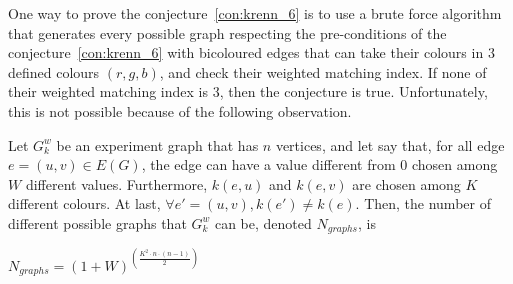 One way to prove the conjecture~\ref{con:krenn_6} is to use a brute force algorithm that generates every possible graph respecting the pre-conditions of the conjecture~\ref{con:krenn_6} with bicoloured edges that can take their colours in $3$ defined colours $(r, g, b)$, and check their weighted matching index.
If none of their weighted matching index is $3$, then the conjecture is true.
Unfortunately, this is not possible because of the following observation.\\

\begin{observation}
    Let $G_k^w$ be an experiment graph that has $n$ vertices, and let say that, for all edge $e = (u, v) \in E(G)$, the edge can have a value different from $0$ chosen among $W$ different values.
    Furthermore, $k(e, u)$ and $k(e, v)$ are chosen among $K$ different colours.
    At last, $\forall e' = (u, v), k(e') \neq k(e)$.
    Then, the number of different possible graphs that $G_k^w$ can be, denoted $N_{graphs}$, is

    \begin{center}
        $N_{graphs} = (1 + W)^{\left(\frac{K^2 \cdot n \cdot (n-1)}{2}\right)}$
    \end{center}
\end{observation}


